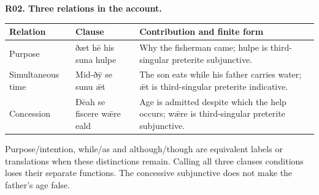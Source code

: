 \par\begin{minipage}{\linewidth}\raggedright
\textbf{R02. Three relations in the account.}

\par\begingroup
\fontsize{10.5}{13.2}\selectfont
\setlength{\LTleft}{0pt}\setlength{\LTright}{\fill}
\noindent
\begin{tabular}{@{}>{\raggedright\arraybackslash}p{21.5mm}>{\raggedright\arraybackslash}p{22.78mm}>{\raggedright\arraybackslash}p{74.09mm}@{}}
\toprule
\textbf{Relation} & \textbf{Clause} & \textbf{Contribution and finite form} \\
\midrule
Purpose & ðæt hē his suna hulpe & Why the fisherman came; hulpe is third-singular preterite subjunctive. \\
Simultaneous time & Mid-ðȳ se sunu ǣt & The son eats while his father carries water; ǣt is third-singular preterite indicative. \\
Concession & Ðēah se fiscere wǣre eald & Age is admitted despite which the help occurs; wǣre is third-singular preterite subjunctive. \\
\bottomrule
\end{tabular}
\par\endgroup

Purpose/\allowbreak{}intention, while/\allowbreak{}as and although/\allowbreak{}though are equivalent labels or translations when these distinctions remain. Calling all three clauses conditions loses their separate functions. The concessive subjunctive does not make the father's age false.

\end{minipage}\par\addvspace{4pt}

